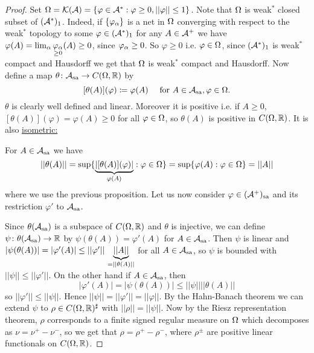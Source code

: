 \documentclass[10pt,english,a4paper]{article}
\theoremstyle{definition}
\def\Assa{\As_{\text{sa}}}
\def\sa{\text{sa}}
\def\vphi{\varphi}
\begin{document}
\begin{proof}

    Set $\Om = \Ks(\As) = \{\vphi \in \As^* : \vphi\geq 0, ||\vphi||\leq 1\}$.
    Note that $\Omega$ is weak$^*$ closed subset of $(\mathcal{A}^*)_{1}$. Indeed, if 
    $\{\vphi_{\al}\}$ is a net in $\Omega$ converging with respect to
    the weak$^*$ topology to some $\vphi \in (\As^*)_1$
    for any $A \in \mathcal{A}^+$ we have $\vphi(A) = \lim_{\al} \underset{\geq
    0}{\vphi_{\al}} (A)\geq 0$, since $\vphi_{\al}\geq 0$.
    So $\vphi\geq 0$ i.e. $\vphi \in \Om$, since $(\mathcal{A}^*)_1$ is weak$^*$ compact
    and Hausdorff we get that $\Omega$ is weak$^*$ compact and Hausdorff. Now
    define a map $\theta \colon \Assa \to C(\Om,\R)$ by 
    \[ [\theta(A)](\vphi)\coloneqq \vphi(A) \quad \text{ for }A\in \Assa, \vphi\in \Om.\]
    $\theta$ is clearly well defined and linear. Moreover it is positive i.e.
    if $A\geq 0$, $[\theta(A)](\vphi) = \vphi(A)\geq 0$ for all $\vphi \in
    \Om$, so $\theta (A)$ is positive in $C(\Omega,\mathbb{R})$. It is also \ul{isometric:}
    
    For $A \in \Assa$ we have 
    \[ ||\theta(A)|| = \sup\{ \ub{|[\theta(A)](\vphi)|}_{\vphi(A)} : \vphi \in \Om \} 
    =\sup\{ \vphi(A) : \vphi \in \Om \} = ||A|| 
    \] 
    where we use the previous proposition. 
    Let us now consider $\vphi \in (\As^+)_{\sa}$ and its restriction 
    $\vphi'$ to $\Assa$.
    
    
    Since $\theta(\Assa)$ is a subspace of $C(\Omega,\mathbb{R})$ and $\theta$ is injective,
    we can define $\psi\colon \theta(\Assa) \to \R$ by 
$\psi(\theta(A)) = \vphi'(A)$ for $A\in \Assa$. Then $\psi$ is linear and
$|\psi(\theta(A))| = |\vphi'(A)| \leq ||\vphi'||\,\ub{||A||}_{=||\theta(A)||} $
for all $A \in \Assa$,
so $\psi$ is bounded with $||\psi|| \leq||\vphi'||$. On the other hand if $A
\in \Assa$, then
\[ |\vphi'(A)| = |\psi(\theta(A))| \leq ||\psi|| ||\theta(A)||\]
so $||\vphi'||\leq ||\psi||$. Hence 
$||\psi|| = ||\vphi'|| = ||\vphi||$. By the Hahn-Banach theorem we can extend
$\psi$ to $\rho \in C(\Omega,\mathbb{R})^{\sharp}$ with $||\rho || = ||\psi||$.
Now by the Riesz representation theorem, $\rho$ corresponds to a finite 
signed regular measure on $\Omega$ which decomposes as $\nu =\nu^+-\nu^-$,
so we get that $\rho =\rho^+ - \rho^-$, where $\rho^{\pm}$ are positive linear functionals
on $C(\Omega,\mathbb{R})$. 


\end{proof}
\end{document}
